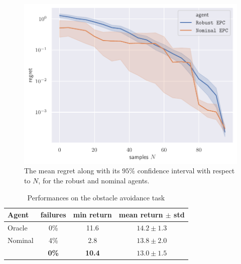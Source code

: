 \begin{figure}[tp]
	\centering
	\includegraphics[width=0.8\linewidth]{img/regret.pdf}
	\caption{The mean regret along with its $95\%$ confidence interval with respect to $N$, for the robust and nominal agents.}
	\label{fig:regret}
\end{figure}

\begin{table}[tbp]
	\caption{Performances on the obstacle avoidance task}
	\label{tab:obstacle}
	\centering
	\begin{tabular}{lccc}
		\toprule
		Agent &
		failures &
		min return &
		mean return $\pm$ std  \\
		\midrule
		Oracle & 0\% & {11.6} & {$14.2 \pm 1.3$} \\
		\midrule
		{Nominal} & {4\%} & {2.8} & \textbf{$\mathbf{13.8} \pm 2.0$} \\
		\Cref{alg:full} & \textbf{0\%} & \textbf{10.4} & {$13.0 \pm 1.5$} \\
		\bottomrule
	\end{tabular}
\end{table}

